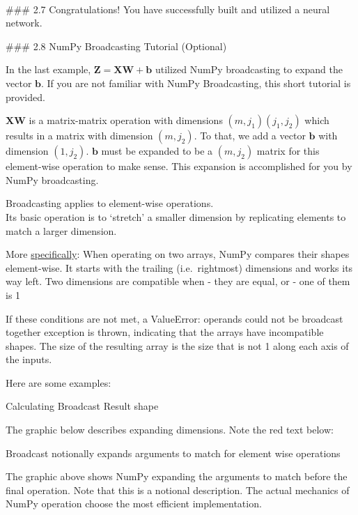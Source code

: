 \documentclass[11pt]{article}
\begin{document}
    \begin{center}
    \end{center}
    { \hspace*{\fill} \\}
    
    \#\#\# 2.7 Congratulations! You have successfully built and utilized a
neural network.

    \#\#\# 2.8 NumPy Broadcasting Tutorial (Optional)

    In the last example, \(\mathbf{Z}=\mathbf{XW} + \mathbf{b}\) utilized
NumPy broadcasting to expand the vector \(\mathbf{b}\). If you are not
familiar with NumPy Broadcasting, this short tutorial is provided.

\(\mathbf{XW}\) is a matrix-matrix operation with dimensions
\((m,j_1)(j_1,j_2)\) which results in a matrix with dimension
\((m,j_2)\). To that, we add a vector \(\mathbf{b}\) with dimension
\((1,j_2)\). \(\mathbf{b}\) must be expanded to be a \((m,j_2)\) matrix
for this element-wise operation to make sense. This expansion is
accomplished for you by NumPy broadcasting.

    Broadcasting applies to element-wise operations.\\
Its basic operation is to `stretch' a smaller dimension by replicating
elements to match a larger dimension.

More
\href{https://NumPy.org/doc/stable/user/basics.broadcasting.html}{specifically}:
When operating on two arrays, NumPy compares their shapes element-wise.
It starts with the trailing (i.e.~rightmost) dimensions and works its
way left. Two dimensions are compatible when - they are equal, or - one
of them is 1

If these conditions are not met, a ValueError: operands could not be
broadcast together exception is thrown, indicating that the arrays have
incompatible shapes. The size of the resulting array is the size that is
not 1 along each axis of the inputs.

Here are some examples:

    Calculating Broadcast Result shape

    The graphic below describes expanding dimensions. Note the red text
below:

    Broadcast notionally expands arguments to match for element wise
operations

    The graphic above shows NumPy expanding the arguments to match before
the final operation. Note that this is a notional description. The
actual mechanics of NumPy operation choose the most efficient
implementation.
\end{document}
